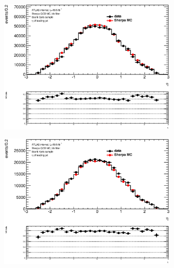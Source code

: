 \begin{figure}[phtb!]
\begin{center}
  \begin{subfigure}[$bbanti$ 3 jet category]{0.3\textwidth}\includegraphics[width=\textwidth]{MonteCarlo/figures/eta0_bbanti_3jets.eps}\end{subfigure}
  \begin{subfigure}[$bbanti$ 4 jet category]{0.3\textwidth}\includegraphics[width=\textwidth]{MonteCarlo/figures/eta0_bbanti_4jets.eps}\end{subfigure}

\end{center}
\end{figure}
